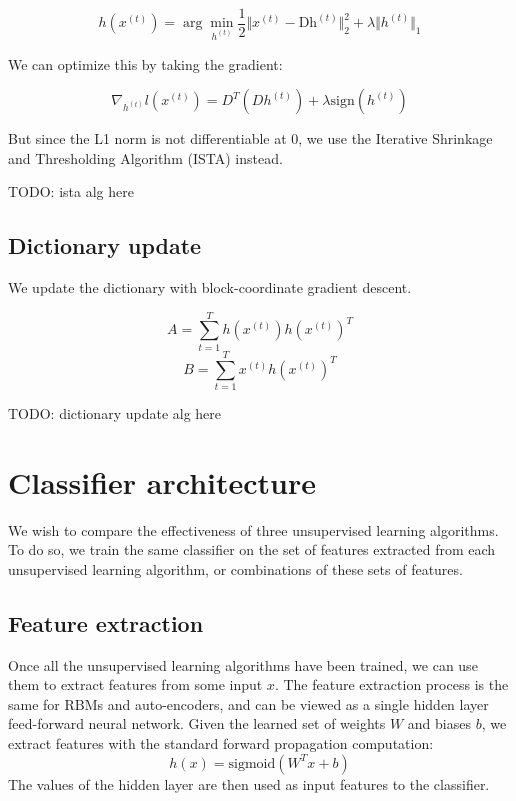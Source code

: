 \documentclass{article} %
\begin{document}
\begin{equation}
h(x^{(t)}) = \arg\min_{h^{(t)}} \frac{1}{2} \Vert x^{(t)} - \text{D} \text{h}^{(t)} \Vert_{2}^{2} + \lambda \Vert h^{(t)} \Vert_{1}
\end{equation}

We can optimize this by taking the gradient:

\begin{equation}
\nabla_{h^{(t)}} l (x^{(t)}) = D^T(D h^{(t)}) + \lambda \text{sign} (h^{(t)})
\end{equation}

But since the L1 norm is not differentiable at 0, we use the Iterative Shrinkage and Thresholding Algorithm (ISTA) instead.

TODO: ista alg here

\subsection{Dictionary update}
We update the dictionary with block-coordinate gradient descent.

\begin{equation}
A = \sum_{t=1}^T h(x^{(t)}) h(x^{(t)})^T
\end{equation}
\begin{equation}
B = \sum_{t=1}^T x^{(t)} h(x^{(t)})^T
\end{equation}

TODO: dictionary update alg here

\section{Classifier architecture}
We wish to compare the effectiveness of three unsupervised learning algorithms. To do so, we train the same classifier on the set of features extracted from each unsupervised learning algorithm, or combinations of these sets of features.

\subsection{Feature extraction}
Once all the unsupervised learning algorithms have been trained, we can use them to extract features from some input $x$. The feature extraction process is the same for RBMs and auto-encoders, and can be viewed as a single hidden layer feed-forward neural network. Given the learned set of weights $W$ and biases $b$, we extract features with the standard forward propagation computation:
\begin{equation}
h(x) = \text{sigmoid}(W^T x + b)
\end{equation}
The values of the hidden layer are then used as input features to the classifier.
\end{document}
